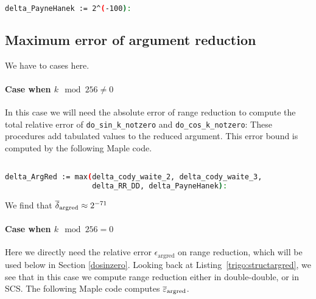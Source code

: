 \begin{lstlisting}[caption={Payne and Hanek error},
  language={sh}, numbers=none]% of course it's maple
%Skip a line here, I don't know why, otherwise latex eats the first line

delta_PayneHanek := 2^(-100):
\end{lstlisting}


\subsection{Maximum error of argument reduction }

We have to cases here.

\paragraph*{Case when $k\mod 256\ne 0$}

In this case we will need the absolute error of range reduction to compute the
total relative error of \verb!do_sin_k_notzero! and
\verb!do_cos_k_notzero!: These procedures add tabulated values to the
reduced argument. This error bound is computed by the following Maple code.

\begin{lstlisting}[caption={Maple script computing the absolute error bound of range reduction}, firstnumber=1,
  language={sh}, numbers=none]% of course it's maple
%Skip a line here, I don't know why, otherwise latex eats the first line

delta_ArgRed := max(delta_cody_waite_2, delta_cody_waite_3,
                    delta_RR_DD, delta_PayneHanek):
\end{lstlisting}

We find that ${\overline{\delta}}_{\mathrm{argred}}\approx 2^{-71}$


\paragraph*{Case when $k\mod 256= 0$}

Here we directly need the relative error $\epsilon_{\mathrm{argred}}$
on range reduction, which will be used below in Section
\ref{dosinzero}. Looking back at Listing~\ref{trigo:structargred}, we
see that in this case we compute range reduction either in
double-double, or in SCS. The following Maple code computes
${\overline{\varepsilon}}_{\mathrm{argred}}$.

